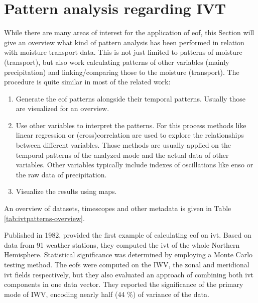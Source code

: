 \section{Pattern analysis regarding IVT}
\label{sec:related_pattern_analysis}





While there are many areas of interest for the application of \ac{eof}, this Section will give an overview what kind of pattern analysis has been performed in relation with moisture transport data.
This is not just limited to patterns of moisture (transport), but also work calculating patterns of other variables (mainly precipitation) and linking/comparing those to the moisture (transport). 
The procedure is quite similar in most of the related work: 

\begin{enumerate}[noitemsep]
  \item Generate the \ac{eof} patterns alongside their temporal patterns. Usually those are visualized for an overview. 
  \item Use other variables to interpret the patterns. For this process methods like linear regression or (cross)correlation are used to explore the relationships between different variables. Those methods are usually applied on the temporal patterns of the analyzed mode and the actual data of other variables. Other variables typically include indexes of oscillations like \ac{enso} \cite{ayantobo_integrated_2022, kim_ensos_2015} or the raw data of precipitation. 
  \item Visualize the results using maps. 
\end{enumerate}

An overview of datasets, timescopes and other metadata is given in Table \ref{tab:ivtpatterns-overview}.

Published in 1982, \citeauthor{salstein_modes_1983} provided the first example of calculating \ac{eof} on \ac{ivt}. 
Based on data from 91 weather stations, they computed the \ac{ivt} of the whole Northern Hemisphere. 
Statistical significance was determined by employing a Monte Carlo testing method. 
The \acp{eof} were computed on the IWV, the zonal and meridional \ac{ivt} fields respectively, but they also evaluated an approach of combining both \ac{ivt} components in one data vector. 
They reported the significance of the primary mode of IWV, encoding nearly half (44 \%) of variance of the data.

